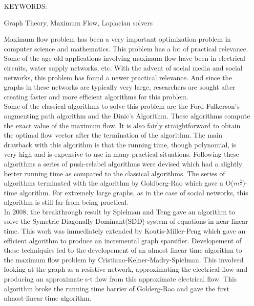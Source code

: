 \documentclass[BTech]{iitmdiss}
\begin{document}
\abstract

\noindent KEYWORDS: \hspace*{0.5em} \parbox[t]{4.4in}{Graph Theory,
Maximum Flow, Laplacian solvers }

\vspace*{24pt}

Maximum flow problem has been a very important optimization problem in computer science and mathematics. This problem has a lot of practical relevance.
Some of the age-old applications involving maximum flow have been in electrical circuits, water supply networks, etc. With the advent of social media
and social networks, this problem has found a newer practical relevance. And since the graphs in these networks are typically very large,
researchers are sought after creating faster and more efficient algorithms for this problem. \\

Some of the classical algorithms to solve this problem are the Ford-Fulkerson's augmenting path algorithm and the Dinic's Algorithm. These algorithms
compute the exact value of the maximum flow. It is also fairly straightforward to obtain the optimal flow vector after the termination of the
algorithm. The main drawback with this algorithm is that the running time, though polynomial, is very high and is expensive to use in many practical
situations. Following these algorithms a series of push-relabel algorithms were devised which had a slightly better running time as compared to the 
classical algorithms. The series of algorithms terminated with the algorithm by Goldberg-Rao which gave a O($m^{\frac{3}{2}}$)-time algorithm. For 
extremely large graphs, as in the case of social networks, this algorithm is still far from being practical. \\

In 2008, the breakthrough result by Spielman and Teng gave an algorithm to solve the Symetric Diagonally Dominant(SDD) system of equations in 
near-linear time. This work was immediately extended by Koutis-Miller-Peng which gave an efficient algorithm to produce an incremental graph sparsifier.
Developement of these techniquies led to the developement of an almost linear time algorithm to the maximum flow problem by Cristiano-Kelner-Madry-Spielman.
This involved looking at the graph as a resistive network, approximating the electrical flow and producing an approximate s-t flow from this approximate
electrical flow. This algorithm broke the running time barrier of Golderg-Rao and gave the first almost-linear time algorithm. \\
\end{document}
